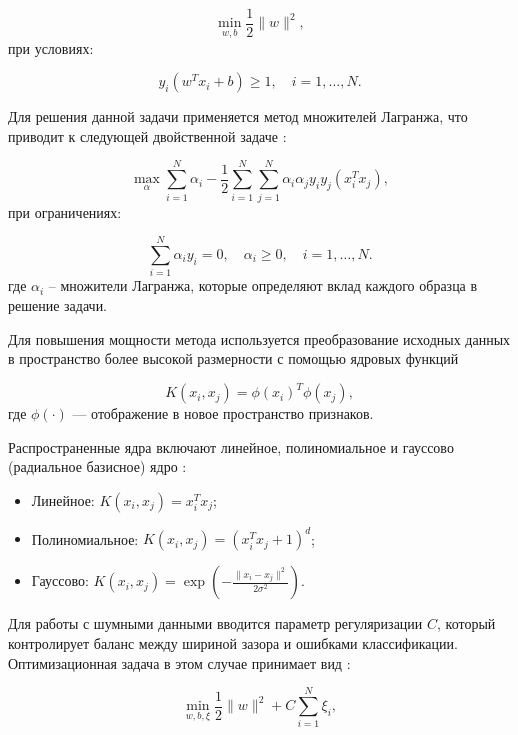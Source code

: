 \begin{equation}
	\min_{w, b} \frac{1}{2} \|w\|^2,
\end{equation}
при условиях:

\begin{equation}
	y_i (w^T x_i + b) \geq 1, \quad i = 1, \ldots, N.
\end{equation}

Для решения данной задачи применяется метод множителей Лагранжа,
что приводит к следующей двойственной задаче \cite{Patle2013}:

\begin{equation}
	\max_{\alpha} \sum_{i=1}^N \alpha_i - \frac{1}{2} \sum_{i=1}^N \sum_{j=1}^N \alpha_i \alpha_j y_i y_j (x_i^T x_j),
\end{equation}
при ограничениях:

\begin{equation}
	\sum_{i=1}^N \alpha_i y_i = 0, \quad \alpha_i \geq 0, \quad i = 1, \ldots, N.
\end{equation}
где $\alpha_i$ -- множители Лагранжа, которые определяют вклад каждого образца в решение задачи.

Для повышения мощности метода используется преобразование исходных данных
в пространство более высокой размерности с помощью ядровых
функций

\begin{equation}
	K(x_i, x_j) = \phi(x_i)^T \phi(x_j),
\end{equation}
где $\phi(\cdot)$ — отображение в новое
пространство признаков.

Распространенные ядра включают линейное,
полиномиальное и гауссово (радиальное базисное) ядро \cite{Deris2011}:

\begin{itemize}
	\item Линейное: $K(x_i, x_j) = x_i^T x_j$;
	\item Полиномиальное: $K(x_i, x_j) = (x_i^T x_j + 1)^d$;
	\item Гауссово: $K(x_i, x_j) = \exp\left(-\frac{\|x_i - x_j\|^2}{2\sigma^2}\right)$.
\end{itemize}

Для работы с шумными данными вводится параметр регуляризации $C$,
который контролирует баланс между шириной зазора и ошибками классификации.
Оптимизационная задача в этом случае принимает вид \cite{Boswell2002}:

\begin{equation}
	\min_{w, b, \xi} \frac{1}{2} \|w\|^2 + C \sum_{i=1}^N \xi_i,
\end{equation}

